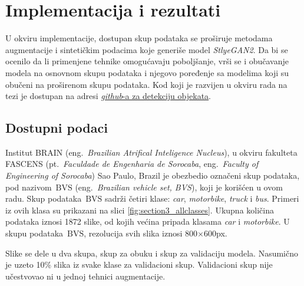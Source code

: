 \documentclass[12pt,oneside]{memoir}
\newcommand{\bvs}{\ensuremath{\,\textrm{BVS}}}
\begin{document}

\chapter{Implementacija i rezultati}
\label{section5}

U okviru implementacije, dostupan skup podataka se proširuje metodama augmentacije i sintetičkim podacima koje generiše model \textit{StlyeGAN2}. %
Da bi se ocenilo da li primenjene tehnike omogućavaju poboljšanje, vrši se i obučavanje modela na osnovnom skupu podataka i njegovo poređenje sa modelima koji su obučeni na proširenom skupu podataka.
Kod koji je razvijen u okviru rada na tezi je dostupan na adresi  \underline{\href{https://github.com/Grula/vehicle-detection}{\textit{github}-a za detekciju objekata}}.


\section{Dostupni podaci}

Institut BRAIN (eng.~\textit{Brazilian Atrifical Inteligence Nucleus}), u okviru fakulteta FASCENS (pt.~\textit{Faculdade de Engenharia de Sorocaba}, eng.~\textit{Faculty of Engineering of Sorocaba}) Sao Paulo, Brazil je obezbedio označeni skup podataka, pod nazivom \bvs{} (eng.~\textit{Brazilian vehicle set, BVS}), koji je korišćen u ovom radu. Skup podataka \bvs{} sadrži četiri klase: \textit{car}, \textit{motorbike}, \textit{truck} i \textit{bus}. Primeri iz ovih klasa su prikazani na slici \ref{fig:section3_allclasses}. Ukupna količina podataka iznosi 1872 slike, od kojih većina pripada klasama \textit{car} i \textit{motorbike}. U skupu podataka \bvs{}, rezolucija svih slika iznosi 800$\times$600px. 

Slike se dele u dva skupa, skup za obuku i skup za validaciju modela. Nasumično je uzeto 10\% slika iz svake klase za validacioni skup. Validacioni skup nije učestvovao ni u jednoj tehnici augmentacije. 
\end{document}
